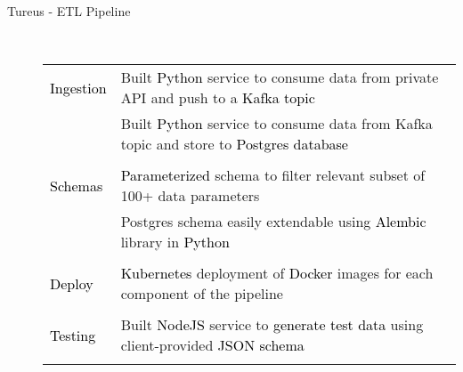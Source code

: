 \documentclass[11pt]{article}
\begin{document}
\begin{description}
\begin{description}
                \item[Tureus - ETL Pipeline] \hfill\\
                \textcolor{gray}{
                    \begin{tabular}{l|l}
                        \\[-1.0mm]
                        \textcolor{black}{Ingestion}
                            & Built \textcolor{black}{Python} service to consume data from private API and push to a \textcolor{black}{Kafka topic}\\
                            & Built \textcolor{black}{Python} service to consume data from Kafka topic and store to \textcolor{black}{Postgres database}\\
                        \\[-1.7mm]
                        \textcolor{black}{Schemas}
                            & \textcolor{black}{Parameterized} schema to filter relevant subset of 100+ data parameters\\
                            & Postgres schema easily extendable using \textcolor{black}{Alembic} library in \textcolor{black}{Python}\\
                        \\[-1.7mm]
                        \textcolor{black}{Deploy}
                            & \textcolor{black}{Kubernetes} deployment of \textcolor{black}{Docker} images for each component of the pipeline\\
                        \\[-1.7mm]
                        \textcolor{black}{Testing}
                            & Built \textcolor{black}{NodeJS} service to \textcolor{black}{generate test data} using client-provided \textcolor{black}{JSON schema}\\
                        \\[-1.0mm]
                    \end{tabular}
                }


\end{description}
\end{description}
\end{document}
